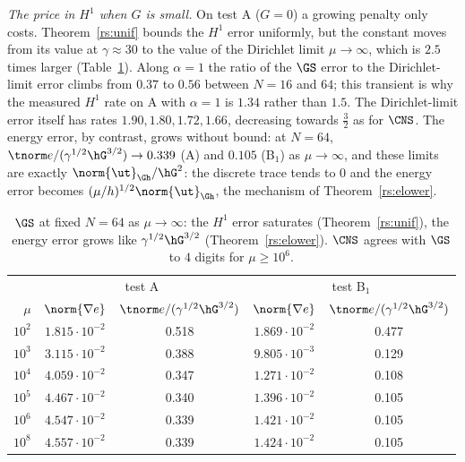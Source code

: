 \emph{The price in $H^1$ when $G$ is small.} On test A ($G=0$) a growing penalty only costs. Theorem~\ref{rs:unif} bounds the $H^1$ error uniformly, but the constant moves from its value at $\gamma\approx30$ to the value of the Dirichlet limit $\mu\to\infty$, which is $2.5$ times larger (Table~\ref{rs:tab:mu}). Along $\alpha=1$ the ratio of the $\GS$ error to the Dirichlet-limit error climbs from $0.37$ to $0.56$ between $N=16$ and $64$; this transient is why the measured $H^1$ rate on A with $\alpha=1$ is $1.34$ rather than $1.5$. The Dirichlet-limit error itself has rates $1.90,1.80,1.72,1.66$, decreasing towards $\frac32$ as for $\CNS$. The energy error, by contrast, grows without bound: at $N=64$, $\tnorm e/(\gamma^{1/2}\hG^{3/2})\to0.339$ (A) and $0.105$ (B$_1$) as $\mu\to\infty$, and these limits are exactly $\norm{\ut}_{\Gh}/\hG^2$: the discrete trace tends to $0$ and the energy error becomes $(\mu/h)^{1/2}\norm{\ut}_{\Gh}$, the mechanism of Theorem~\ref{rs:elower}.

\begin{table}[h]
\centering\small
\caption{$\GS$ at fixed $N=64$ as $\mu\to\infty$: the $H^1$ error saturates (Theorem~\ref{rs:unif}), the energy error grows like $\gamma^{1/2}\hG^{3/2}$ (Theorem~\ref{rs:elower}). $\CNS$ agrees with $\GS$ to $4$ digits for $\mu\ge10^6$.}\label{rs:tab:mu}
\begin{tabular}{rcccc}
\toprule
 & \multicolumn{2}{c}{test A} & \multicolumn{2}{c}{test B$_1$}\\
$\mu$ & $\norm{\nabla e}$ & $\tnorm e/(\gamma^{1/2}\hG^{3/2})$ & $\norm{\nabla e}$ & $\tnorm e/(\gamma^{1/2}\hG^{3/2})$\\
\midrule
$10^2$ & $1.815\cdot10^{-2}$ & 0.518 & $1.869\cdot10^{-2}$ & 0.477\\
$10^3$ & $3.115\cdot10^{-2}$ & 0.388 & $9.805\cdot10^{-3}$ & 0.129\\
$10^4$ & $4.059\cdot10^{-2}$ & 0.347 & $1.271\cdot10^{-2}$ & 0.108\\
$10^5$ & $4.467\cdot10^{-2}$ & 0.340 & $1.396\cdot10^{-2}$ & 0.105\\
$10^6$ & $4.547\cdot10^{-2}$ & 0.339 & $1.421\cdot10^{-2}$ & 0.105\\
$10^8$ & $4.557\cdot10^{-2}$ & 0.339 & $1.424\cdot10^{-2}$ & 0.105\\
\bottomrule
\end{tabular}
\end{table}

